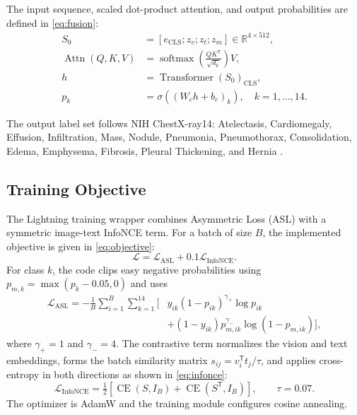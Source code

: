 \documentclass[conference]{IEEEtran}
\begin{document}
The input sequence, scaled dot-product attention, and output probabilities are defined in \eqref{eq:fusion}:
\begin{align}
S_0 &= [e_{\mathrm{CLS}};z_v;z_t;z_m] \in \mathbb{R}^{4\times512}, \\
\operatorname{Attn}(Q,K,V) &=
\operatorname{softmax}\!\left(\frac{QK^{\mathsf T}}{\sqrt{d_k}}\right)V, \\
h &= \operatorname{Transformer}(S_0)_{\mathrm{CLS}}, \\
p_k &= \sigma((W_ch+b_c)_k),\quad k=1,\ldots,14.
\label{eq:fusion}
\end{align}

The output label set follows NIH ChestX-ray14: Atelectasis, Cardiomegaly, Effusion, Infiltration, Mass, Nodule, Pneumonia, Pneumothorax, Consolidation, Edema, Emphysema, Fibrosis, Pleural Thickening, and Hernia \cite{wang2017}.

\subsection{Training Objective}
The Lightning training wrapper combines Asymmetric Loss (ASL) with a symmetric image-text InfoNCE term. For a batch of size $B$, the implemented objective is given in \eqref{eq:objective}:
\begin{equation}
\mathcal{L}=\mathcal{L}_{\mathrm{ASL}}+0.1\mathcal{L}_{\mathrm{InfoNCE}}.
\label{eq:objective}
\end{equation}
For class $k$, the code clips easy negative probabilities using $p_{m,k}=\max(p_k-0.05,0)$ and uses
\begin{equation}
\begin{aligned}
\mathcal{L}_{\mathrm{ASL}}=-\frac{1}{B}\sum_{i=1}^{B}\sum_{k=1}^{14}\Big[&
y_{ik}(1-p_{ik})^{\gamma_+}\log p_{ik}\\
&+(1-y_{ik})p_{m,ik}^{\gamma_-}\log(1-p_{m,ik})\Big],
\end{aligned}
\label{eq:asl}
\end{equation}
where $\gamma_+=1$ and $\gamma_-=4$. The contrastive term normalizes the vision and text embeddings, forms the batch similarity matrix $s_{ij}=v_i^{\mathsf T}t_j/\tau$, and applies cross-entropy in both directions as shown in \eqref{eq:infonce}:
\begin{equation}
\mathcal{L}_{\mathrm{InfoNCE}}=\tfrac{1}{2}\left[
\operatorname{CE}(S,I_B)+\operatorname{CE}(S^{\mathsf T},I_B)\right],
\qquad \tau=0.07.
\label{eq:infonce}
\end{equation}
The optimizer is AdamW and the training module configures cosine annealing.
\end{document}
